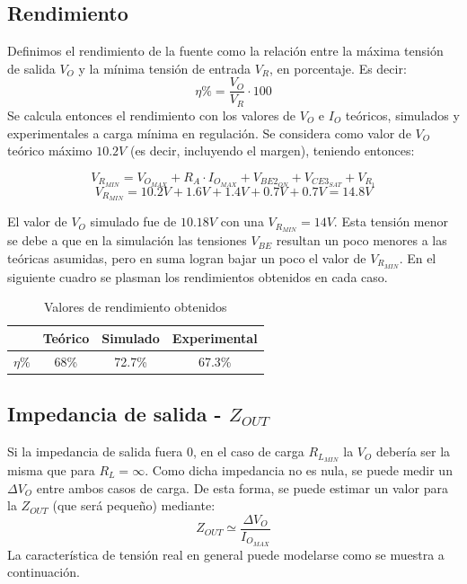 \subsection{Rendimiento}

Definimos el rendimiento de la fuente como la relaci\'on entre la m\'axima tensi\'on de salida $V_O$ y la m\'inima tensi\'on de entrada $V_R$, en porcentaje. Es decir:
\[
\eta \% = \frac{V_O}{V_R} \cdot 100
\]
Se calcula entonces el rendimiento con los valores de $V_O$ e $I_O$ te\'oricos, simulados y experimentales a carga m\'inima en regulaci\'on.
Se considera como valor de $V_O$ te\'orico m\'aximo $10.2V$ (es decir, incluyendo el margen), teniendo entonces:

\[
V_{R_{MIN}} = V_{O_{MAX}} + R_A \cdot I_{O_{MAX}} + V_{BE2_{ON}} + V_{CE3_{SAT}} + V_{R_1}
\]
\[
V_{R_{MIN}} = 10.2V + 1.6V + 1.4V + 0.7V + 0.7V = 14.8V 
\]

\newpage

El valor de $V_O$ simulado fue de $10.18V$ con una $V_{R_{MIN}}= 14V$. Esta tensi\'on menor se debe a que en la simulaci\'on las tensiones $V_{BE}$ resultan un poco menores a las te\'oricas asumidas, pero en suma logran bajar un poco el valor de $V_{R_{MIN}}$. En el siguiente cuadro se plasman los rendimientos obtenidos en cada caso.

\begin{table}[!ht]
\begin{center}
\begin{tabular}{|c||c|c|c|}
\hline
& Te\'orico & Simulado & Experimental\\
\hline 
$\eta \%$ & 68\% & 72.7\% & 67.3\%\\
\hline 
\end{tabular}
\end{center}

\caption{Valores de rendimiento obtenidos}
\end{table}

\subsection{Impedancia de salida - $Z_{OUT}$}
 
Si la impedancia de salida fuera 0, en el caso de carga $R_{L_{MIN}}$ la $V_O$ deber\'ia ser la misma que para $R_L = \infty $. Como dicha impedancia no es nula, se puede medir un $\Delta V_O$ entre ambos casos de carga. De esta forma, se puede estimar un valor para la $Z_{OUT}$ (que ser\'a peque\~no) mediante:
\[
Z_{OUT} \simeq \frac{\Delta V_O}{I_{O_{MAX}}}   
\]
La caracter\'istica de tensi\'on real en general puede modelarse como se muestra a continuaci\'on.

